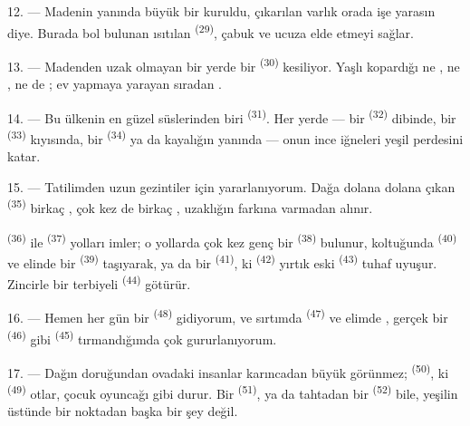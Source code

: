 12. --- Madenin yanında büyük bir  kuruldu, çıkarılan
varlık orada işe yarasın diye. Burada bol bulunan  ısıtılan
 \textsuperscript{(29)}, çabuk ve ucuza 
elde etmeyi sağlar.

13. --- Madenden uzak olmayan bir yerde bir 
\textsuperscript{(30)} kesiliyor. Yaşlı 
 kopardığı ne , ne , ne
de ; ev yapmaya yarayan sıradan .

14. --- Bu ülkenin en güzel süslerinden biri 
\textsuperscript{(31)}. Her yerde --- bir 
\textsuperscript{(32)} dibinde, bir  \textsuperscript{(33)}
kıyısında, bir  \textsuperscript{(34)} ya da kayalığın
yanında --- onun ince iğneleri yeşil perdesini katar.

\VUsaut{3.0mm}
\VUsaut{3.0mm}

15. --- Tatilimden uzun gezintiler için yararlanıyorum. Dağa dolana dolana
çıkan  \textsuperscript{(35)} birkaç , çok
kez de birkaç , uzaklığın farkına varmadan alınır.

 \textsuperscript{(36)} ile 
\textsuperscript{(37)} yolları imler; o yollarda çok kez genç bir
 \textsuperscript{(38)} bulunur, koltuğunda
 \textsuperscript{(40)} ve elinde bir 
\textsuperscript{(39)} taşıyarak, ya da bir 
\textsuperscript{(41)}, ki  \textsuperscript{(42)} yırtık
eski  \textsuperscript{(43)} tuhaf uyuşur. Zincirle bir
terbiyeli  \textsuperscript{(44)} götürür.

\VUsaut{3.0mm}

16. --- Hemen her gün bir  \textsuperscript{(48)}
 gidiyorum, ve sırtımda 
\textsuperscript{(47)} ve elimde , gerçek bir
 \textsuperscript{(46)} gibi 
\textsuperscript{(45)} tırmandığımda çok gururlanıyorum.

17. --- Dağın doruğundan ovadaki insanlar karıncadan büyük görünmez;
 \textsuperscript{(50)}, ki 
\textsuperscript{(49)} otlar, çocuk oyuncağı gibi durur. Bir 
\textsuperscript{(51)}, ya da tahtadan bir 
\textsuperscript{(52)} bile, yeşilin üstünde bir noktadan başka bir şey
değil.

